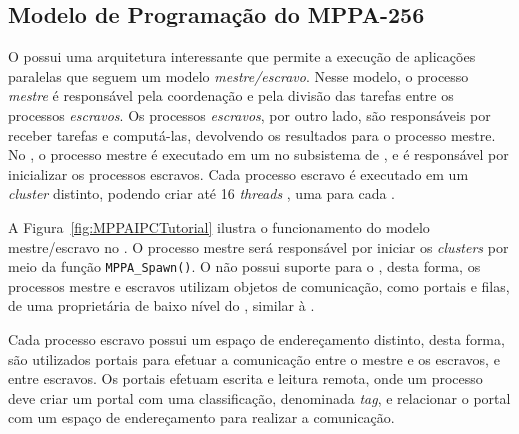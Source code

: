 \subsection{Modelo de Programação do MPPA-256}
\label{sec:prog-mppa}
%
%
%

O \mppa possui uma arquitetura interessante que permite a execução de aplicações paralelas
que seguem um modelo \textit{mestre/escravo}. Nesse modelo, o processo \textit{mestre} é responsável
pela coordenação e pela divisão das tarefas entre os processos \textit{escravos}. Os processos \textit{escravos},
por outro lado, são responsáveis por receber tarefas e computá-las, devolvendo os resultados para o processo
mestre. No \mppa, o processo mestre é executado em um \rman no subsistema de
\es, e é responsável por inicializar os processos escravos. Cada processo escravo
é executado em um \textit{cluster} distinto, podendo criar até 16 \textit{threads} \posix, uma para cada \pe.

A Figura~\ref{fig:MPPAIPCTutorial} ilustra o funcionamento do modelo mestre/escravo
no \mppa. O processo mestre será responsável por iniciar os
\textit{clusters} por meio da função \texttt{MPPA\_Spawn()}.
O \mppa não possui suporte para o \mpi, desta forma, os processos mestre e
escravos utilizam objetos de comunicação, como portais e filas, de
uma \api proprietária de baixo nível do \mppa, similar à \posix \ipc.

Cada processo escravo possui um espaço de endereçamento distinto, desta forma,
são utilizados portais para efetuar a comunicação entre o mestre e os escravos, e entre escravos. Os
portais efetuam escrita e leitura remota, onde um processo deve criar um portal
com uma classificação, denominada \textit{tag}, e relacionar o portal com um
espaço de endereçamento para realizar a comunicação.

